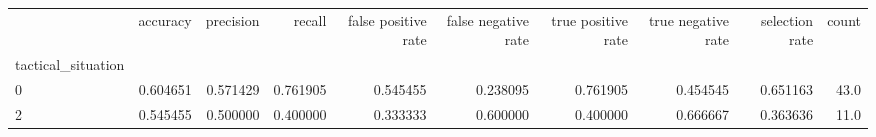 \begin{tabular}{lrrrrrrrrr}
\toprule
{} &  accuracy &  precision &    recall &  false positive rate &  false negative rate &  true positive rate &  true negative rate &  selection rate &  count \\
tactical\_situation &           &            &           &                      &                      &                     &                     &                 &        \\
\midrule
0                  &  0.604651 &   0.571429 &  0.761905 &             0.545455 &             0.238095 &            0.761905 &            0.454545 &        0.651163 &   43.0 \\
2                  &  0.545455 &   0.500000 &  0.400000 &             0.333333 &             0.600000 &            0.400000 &            0.666667 &        0.363636 &   11.0 \\
\bottomrule
\end{tabular}

